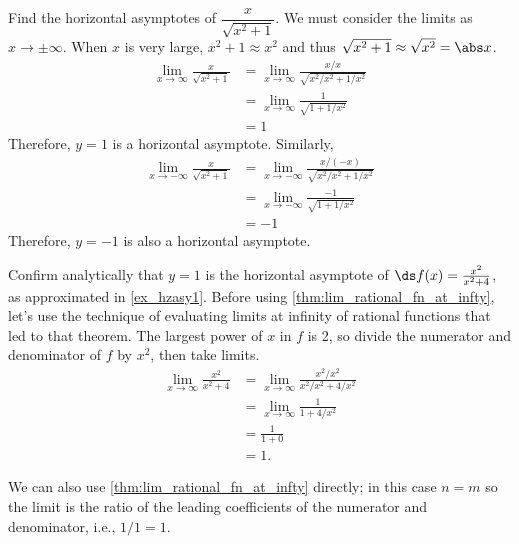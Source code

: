 \begin{example}\label{ex_sqrt_asy}
Find the horizontal asymptotes of $\dfrac{x}{\sqrt{x^2+1}}$.
\solution We must consider the limits as $x\to \pm \infty$. When $x$ is very large, $x^2+1\approx x^2$ and thus $\sqrt{x^2+1}\approx \sqrt{x^2}=\abs x$.
\begin{align*}
\lim_{x\to\infty}\frac{x}{\sqrt{x^2+1}}
&=\lim_{x\to\infty}\frac{x/x}{\sqrt{x^2/{x^2}+1/{x^2}}}\\
&=\lim_{x\to\infty}\frac{1}{\sqrt{1+1/{x^2}}}\\
&=1
\end{align*}
Therefore, $y=1$ is a horizontal asymptote.
Similarly, 
\begin{align*}
\lim_{x\to-\infty}\frac{x}{\sqrt{x^2+1}}
&=\lim_{x\to-\infty}\frac{x/(-x)}{\sqrt{x^2/{x^2}+1/{x^2}}}\\
&=\lim_{x\to-\infty}\frac{-1}{\sqrt{1+1/{x^2}}}\\
&=-1
\end{align*}
Therefore, $y=-1$ is also a horizontal asymptote.
\end{example}

\begin{example}\label{ex_hzasy2}
Confirm analytically that $y=1$ is the horizontal asymptote of $\ds f(x) = \frac{x^2}{x^2+4}$, as approximated in \autoref{ex_hzasy1}.
\solution
Before using \autoref{thm:lim_rational_fn_at_infty}, let's use the technique of evaluating limits at infinity of rational functions that led to that theorem. The largest power of $x$ in $f$ is 2, so divide the numerator and denominator of $f$ by $x^2$, then take limits.\vspace{-.3\baselineskip}
\begin{align*}
	\lim_{x\to\infty}\frac{x^2}{x^2+4}
	&= \lim_{x\to\infty}\frac{x^2/x^2}{x^2/x^2+4/x^2}\\
	&= \lim_{x\to\infty}\frac{1}{1+4/x^2}\\
	&= \frac1{1+0}\\
	&= 1.
\end{align*}

We can also use \autoref{thm:lim_rational_fn_at_infty} directly; in this case $n=m$ so the limit is the ratio of the leading coefficients of the numerator and denominator, i.e., $1/1=1$.
\end{example}

